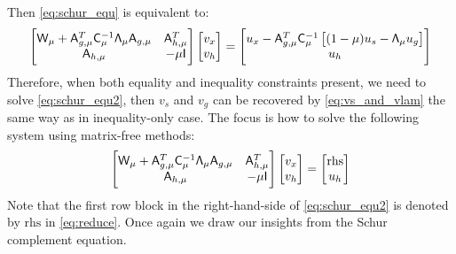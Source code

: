 Then \eqref{eq:schur_equ} is equivalent to: 
\begin{equation}\label{eq:schur_equ2}
\begin{bmatrix}
\mathsf{W}_\mu +  \mathsf{A}_{g,\mu}^T  \mathsf{C}_\mu^{-1} \mathsf{\Lambda}_\mu    \mathsf{A}_{g,\mu}    & \mathsf{A}_{h,\mu}^T   \\
\mathsf{A}_{h,\mu}  & -\mu \mathsf{I}
\end{bmatrix}
\begin{bmatrix} v_x \\ v_h  \end{bmatrix} 
=
\begin{bmatrix} u_x - \mathsf{A}_{g,\mu}^T \mathsf{C}_\mu^{-1}  \left[(1-\mu) u_s  - \mathsf{\Lambda}_\mu u_g     \right]  \\ u_h  \end{bmatrix} 
\end{equation}
Therefore, when both equality and inequality constraints present, we need to solve \eqref{eq:schur_equ2}, then 
$v_s$ and $v_g$ can be recovered by \eqref{eq:vs_and_vlam} the same way as in inequality-only case.
The focus is how to solve the following system using matrix-free methods: 
\begin{equation}\label{eq:reduce}
\begin{bmatrix}
\mathsf{W}_\mu +  \mathsf{A}_{g,\mu}^T  \mathsf{C}_\mu^{-1} \mathsf{\Lambda}_\mu  \mathsf{A}_{g,\mu}    & \mathsf{A}_{h,\mu}^T   \\
\mathsf{A}_{h,\mu}  & -\mu \mathsf{I}
\end{bmatrix}
\begin{bmatrix} v_x \\ v_h  \end{bmatrix} 
=
\begin{bmatrix} \text{rhs}   \\ u_h  \end{bmatrix} 
\end{equation}
Note that the first row block in the right-hand-side of \eqref{eq:schur_equ2} is denoted by $\text{rhs}$ in \eqref{eq:reduce}.  
Once again we draw our insights from the Schur complement equation. 
